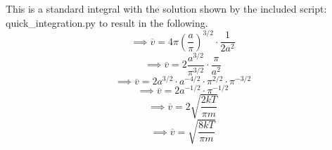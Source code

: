 \documentclass[12pt]{article}
\begin{document}
\begin{flushleft}
This is a standard integral with the solution shown by the included script: quick\_integration.py to result in the following.
$$\implies\overline{v}=4\pi\left(\frac{a}{\pi}\right)^{3/2}\cdot\frac{1}{2a^2}$$
$$\implies\overline{v}=2\frac{a^{3/2}}{\pi^{3/2}}\cdot\frac{\pi}{a^2}$$
$$\implies\overline{v}=2a^{3/2}\cdot a^{-4/2}\cdot\pi^{2/2}\cdot\pi^{-3/2}$$
$$\implies\overline{v}=2a^{-1/2}\cdot\pi^{-1/2}$$
$$\implies\overline{v}=2\sqrt{\frac{2kT}{\pi m}}$$
$$\implies\overline{v}=\sqrt{\frac{8kT}{\pi m}}$$



\end{flushleft}
\end{document}
